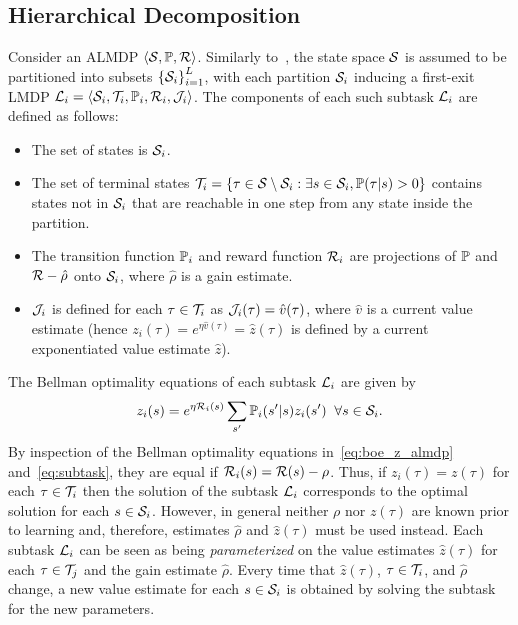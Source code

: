\subsection{Hierarchical Decomposition}
Consider an ALMDP $\langle\mathcal{S},\mathbb{P},\mathcal{R}\rangle$. 
Similarly to~\citet{Infante2022}, the state space $\mathcal{S}$ is assumed to be partitioned into subsets $\left\{\mathcal{S}_i\right\}^L_{i=1}$, with each partition $\mathcal{S}_i$ inducing
a first-exit LMDP $\mathcal{L}_i = \langle\mathcal{S}_i, \mathcal{T}_i, \mathbb{P}_i, \mathcal{R}_i,\mathcal{J}_i\rangle$.
The components of each such subtask $\mathcal{L}_i$ are defined as follows:
\begin{itemize}
  \item The set of states is $\mathcal{S}_i$.
  \item The set of terminal states $\mathcal{T}_i=\{\tau\in\mathcal{S}\setminus\mathcal{S}_i: \exists s\in\mathcal{S}_i, \mathbb{P}(\tau|s)>0\}$ contains states not in $\mathcal{S}_i$ that are reachable in one step from any state inside the partition.
  \item The transition function $\mathbb{P}_i$ and reward function $\mathcal{R}_i$ are projections of $\mathbb{P}$ and $\mathcal{R}-\hat\rho$ onto $\mathcal{S}_i$, where $\hat\rho$ is a gain estimate.
  \item $\mathcal{J}_i$ is defined for each $\tau\in\mathcal{T}_i$ as $\mathcal{J}_i(\tau)=\hat v(\tau)$, where $\hat v$ is a current value estimate (hence $z_i(\tau)=e^{\eta\hat v(\tau)} = \hat z(\tau)$ is defined by a current exponentiated value estimate $\hat z$).
\end{itemize}
The Bellman optimality equations of each subtask $\mathcal{L}_i$ are given by
\begin{equation}\label{eq:subtask}
  z_i(s) = e^{\eta \mathcal{R}_i(s)} \sum_{s'} \mathbb{P}_i(s'|s) z_i(s') \;\; \forall s\in\mathcal{S}_i.
\end{equation}
By inspection of the Bellman optimality equations in~\eqref{eq:boe_z_almdp} and~\eqref{eq:subtask}, they are equal if $\mathcal{R}_i(s)=\mathcal{R}(s)-\rho$. Thus, if $z_i(\tau)=z(\tau)$ for each $\tau\in\mathcal{T}_i$ then the solution of the subtask $\mathcal{L}_i$ corresponds to the optimal solution for each $s\in\mathcal{S}_i$. However, in general neither $\rho$ nor $z(\tau)$ are known prior to learning and, therefore, estimates $\hat\rho$ and $\hat z(\tau)$ must be used instead. Each subtask $\mathcal{L}_i$ can be seen as being {\it parameterized\/} on the value estimates $\hat z(\tau)$ for each $\tau\in\mathcal{T}_j$ and the gain estimate $\hat\rho$. Every time that $\hat z(\tau)$, $\tau\in\mathcal{T}_i$, and $\hat\rho$ change, a new value estimate for each $s\in\mathcal{S}_i$ is obtained by solving the subtask for the new parameters.

